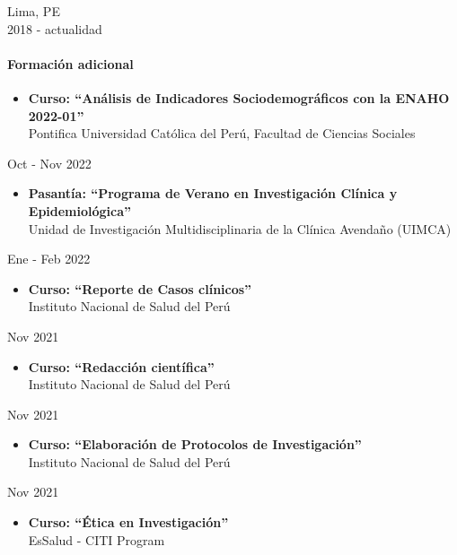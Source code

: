 \documentclass[
  letterpaper,
  DIV=11,
  numbers=noendperiod]{scrartcl}
\let\oldparagraph\paragraph
\renewcommand{\paragraph}[1]{\oldparagraph{#1}\mbox{}}
\providecommand{\tightlist}{%
  \setlength{\itemsep}{0pt}\setlength{\parskip}{0pt}}\usepackage{longtable,booktabs,array}
\begin{document}
Lima, PE\\
2018 - actualidad

\hypertarget{formaciuxf3n-adicional}{%
\paragraph{Formación adicional}\label{formaciuxf3n-adicional}}

\begin{itemize}
\tightlist
\item
  \textbf{Curso: ``Análisis de Indicadores Sociodemográficos con la
  ENAHO 2022-01''}\\
  Pontifica Universidad Católica del Perú, Facultad de Ciencias Sociales
\end{itemize}

Oct - Nov 2022

\begin{itemize}
\tightlist
\item
  \textbf{Pasantía: ``Programa de Verano en Investigación Clínica y
  Epidemiológica''}\\
  Unidad de Investigación Multidisciplinaria de la Clínica Avendaño
  (UIMCA)
\end{itemize}

Ene - Feb 2022

\begin{itemize}
\tightlist
\item
  \textbf{Curso: ``Reporte de Casos clínicos''}\\
  Instituto Nacional de Salud del Perú
\end{itemize}

Nov 2021

\begin{itemize}
\tightlist
\item
  \textbf{Curso: ``Redacción científica''}\\
  Instituto Nacional de Salud del Perú
\end{itemize}

Nov 2021

\begin{itemize}
\tightlist
\item
  \textbf{Curso: ``Elaboración de Protocolos de Investigación''}\\
  Instituto Nacional de Salud del Perú
\end{itemize}

Nov 2021

\begin{itemize}
\tightlist
\item
  \textbf{Curso: ``Ética en Investigación''}\\
  EsSalud - CITI Program
\end{itemize}
\end{document}
